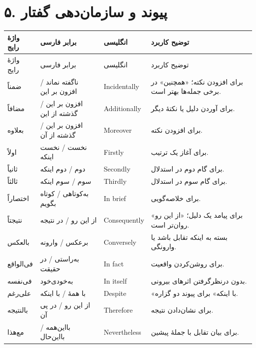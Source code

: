 \section*{۵. پیوند و سازمان‌دهی گفتار}
\begingroup
\small
\setlength{\tabcolsep}{4pt}
\renewcommand{\arraystretch}{1.3}
\begin{longtable}{|p{2.5cm}|p{4.0cm}|p{2.3cm}|p{5.3cm}|}
\hline
واژهٔ رایج & برابر فارسی & انگلیسی & توضیح کاربرد \\
\hline
\endfirsthead
\hline
واژهٔ رایج & برابر فارسی & انگلیسی & توضیح کاربرد \\
\hline
\endhead

ضمناً & ناگفته نماند / افزون بر این & \textenglish{Incidentally} & برای افزودن نکته؛ «همچنین» در برخی جمله‌ها بهتر است. \\
\hline
مضافاً & افزون بر این / گذشته از این & \textenglish{Additionally} & برای آوردن دلیل یا نکتهٔ دیگر. \\
\hline
بعلاوه & افزون بر این / گذشته از آن & \textenglish{Moreover} & برای افزودن نکته. \\
\hline
اولاً & نخست / نخست اینکه & \textenglish{Firstly} & برای آغاز یک ترتیب. \\
\hline
ثانیاً & دوم / دوم اینکه & \textenglish{Secondly} & برای گام دوم در استدلال. \\
\hline
ثالثاً & سوم / سوم اینکه & \textenglish{Thirdly} & برای گام سوم در استدلال. \\
\hline
اختصاراً & به‌کوتاهی / کوتاه بگویم & \textenglish{In brief} & برای خلاصه‌گویی. \\
\hline
نتیجتاً & از این رو / در نتیجه & \textenglish{Consequently} & برای پیامد یک دلیل؛ «از این رو» روان‌تر است. \\
\hline
بالعکس & برعکس / وارونه & \textenglish{Conversely} & بسته به اینکه تقابل باشد یا وارونگی. \\
\hline
فی‌الواقع & به‌راستی / در حقیقت & \textenglish{In fact} & برای روشن‌کردن واقعیت. \\
\hline
فی‌نفسه & به‌خودی‌خود & \textenglish{In itself} & بدون درنظرگرفتن اثرهای بیرونی. \\
\hline
علی‌رغم & با همهٔ / با اینکه & \textenglish{Despite} & «با اینکه» برای پیوند دو گزاره. \\
\hline
بالنتیجه & از این رو / در پی آن & \textenglish{Therefore} & برای نشان‌دادن نتیجه. \\
\hline
مع‌هذا & بااین‌همه / بااین‌حال & \textenglish{Nevertheless} & برای بیان تقابل با جملهٔ پیشین. \\
\hline
\end{longtable}
\endgroup



